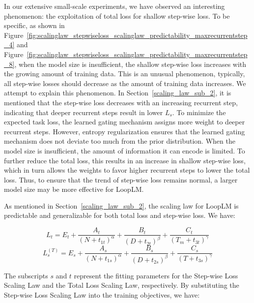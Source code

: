 \documentclass[]{bytedance_seed}
\newcommand{\1}{\mathbf{1}}
\newcommand{\ut}{LoopLM}
\begin{document}
In our extensive small-scale experiments, we have observed an interesting phenomenon: the exploitation of total loss for shallow step-wise loss. To be specific, as shown in Figure~\ref{fig:scalinglaw_stepwiseloss_scalinglaw_predictability_maxrecurrentstep_4} and Figure~\ref{fig:scalinglaw_stepwiseloss_scalinglaw_predictability_maxrecurrentstep_8}, when the model size is insufficient, the shallow step-wise loss increases with the growing amount of training data. This is an unusual phenomenon, typically, all step-wise losses should decrease as the amount of training data increases. We attempt to explain this phenomenon. In Section~\ref{scaling_law_sub_2}, it is mentioned that the step-wise loss decreases with an increasing recurrent step, indicating that deeper recurrent steps result in lower $L_s$. To minimize the expected task loss, the learned gating mechanism assigns more weight to deeper recurrent steps. However, entropy regularization ensures that the learned gating mechanism does not deviate too much from the prior distribution. When the model size is insufficient, the amount of information it can encode is limited. To further reduce the total loss, this results in an increase in shallow step-wise loss, which in turn allows the weights to favor higher recurrent steps to lower the total loss. 
Thus, to ensure that the trend of step-wise loss remains normal, a larger model size may be more effective for \ut{}.

As mentioned in Section~\ref{scaling_law_sub_2}, the scaling law for \ut{} is predictable and generalizable for both total loss and step-wise loss. We have:



$$
L_t = E_t + \frac{A_t}{(N+t_{1t})^\alpha} + \frac{B_t}{(D+t_{2t})^\beta} + \frac{C_t}{(T_m+t_{3t})^\gamma}
$$
$$
L_s^{(T)} = E_s + \frac{A_s}{(N+t_{1s})^\alpha} + \frac{B_s}{(D+t_{2s})^\beta} + \frac{C_s}{(T+t_{3s})^\gamma}
$$

The subscripts $s$ and $t$ represent the fitting parameters for the Step-wise Loss Scaling Law and the Total Loss Scaling Law, respectively. By substituting the Step-wise Loss Scaling Law into the training objectives, we have:
\end{document}
